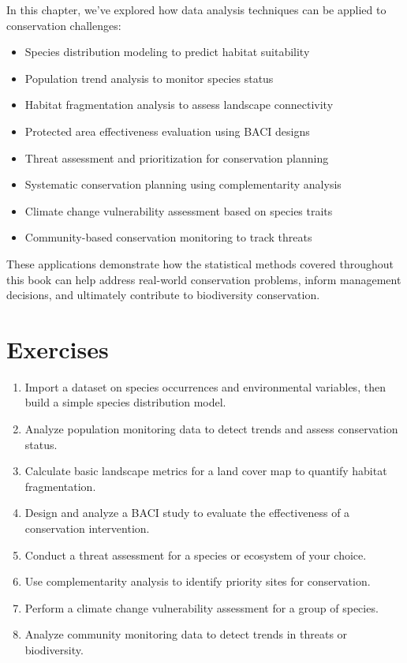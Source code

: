 \documentclass[
  letterpaper,
]{book}
\providecommand{\tightlist}{%
  \setlength{\itemsep}{0pt}\setlength{\parskip}{0pt}}
\begin{document}
In this chapter, we've explored how data analysis techniques can be
applied to conservation challenges:

\begin{itemize}
\tightlist
\item
  Species distribution modeling to predict habitat suitability
\item
  Population trend analysis to monitor species status
\item
  Habitat fragmentation analysis to assess landscape connectivity
\item
  Protected area effectiveness evaluation using BACI designs
\item
  Threat assessment and prioritization for conservation planning
\item
  Systematic conservation planning using complementarity analysis
\item
  Climate change vulnerability assessment based on species traits
\item
  Community-based conservation monitoring to track threats
\end{itemize}

These applications demonstrate how the statistical methods covered
throughout this book can help address real-world conservation problems,
inform management decisions, and ultimately contribute to biodiversity
conservation.

\section{Exercises}\label{exercises-8}

\begin{enumerate}
\def\labelenumi{\arabic{enumi}.}
\tightlist
\item
  Import a dataset on species occurrences and environmental variables,
  then build a simple species distribution model.
\item
  Analyze population monitoring data to detect trends and assess
  conservation status.
\item
  Calculate basic landscape metrics for a land cover map to quantify
  habitat fragmentation.
\item
  Design and analyze a BACI study to evaluate the effectiveness of a
  conservation intervention.
\item
  Conduct a threat assessment for a species or ecosystem of your choice.
\item
  Use complementarity analysis to identify priority sites for
  conservation.
\item
  Perform a climate change vulnerability assessment for a group of
  species.
\item
  Analyze community monitoring data to detect trends in threats or
  biodiversity.
\end{enumerate}
\end{document}
